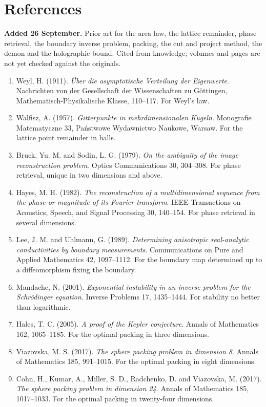 \section{References}

\textbf{Added 26 September.} Prior art for the area law, the lattice remainder, phase retrieval, the boundary inverse problem, packing, the cut and project method, the demon and the holographic bound. Cited from knowledge; volumes and pages are not yet checked against the originals.

\begin{enumerate}
  \item Weyl, H. (1911). \emph{\"Uber die asymptotische Verteilung der Eigenwerte}. Nachrichten von der Gesellschaft der Wissenschaften zu G\"ottingen, Mathematisch-Physikalische Klasse, 110--117. For Weyl's law.
  \item Walfisz, A. (1957). \emph{Gitterpunkte in mehrdimensionalen Kugeln}. Monografie Matematyczne 33, Pa\'nstwowe Wydawnictwo Naukowe, Warsaw. For the lattice point remainder in balls.
  \item Bruck, Yu. M. and Sodin, L. G. (1979). \emph{On the ambiguity of the image reconstruction problem}. Optics Communications 30, 304--308. For phase retrieval, unique in two dimensions and above.
  \item Hayes, M. H. (1982). \emph{The reconstruction of a multidimensional sequence from the phase or magnitude of its Fourier transform}. IEEE Transactions on Acoustics, Speech, and Signal Processing 30, 140--154. For phase retrieval in several dimensions.
  \item Lee, J. M. and Uhlmann, G. (1989). \emph{Determining anisotropic real-analytic conductivities by boundary measurements}. Communications on Pure and Applied Mathematics 42, 1097--1112. For the boundary map determined up to a diffeomorphism fixing the boundary.
  \item Mandache, N. (2001). \emph{Exponential instability in an inverse problem for the Schr\"odinger equation}. Inverse Problems 17, 1435--1444. For stability no better than logarithmic.
  \item Hales, T. C. (2005). \emph{A proof of the Kepler conjecture}. Annals of Mathematics 162, 1065--1185. For the optimal packing in three dimensions.
  \item Viazovska, M. S. (2017). \emph{The sphere packing problem in dimension 8}. Annals of Mathematics 185, 991--1015. For the optimal packing in eight dimensions.
  \item Cohn, H., Kumar, A., Miller, S. D., Radchenko, D. and Viazovska, M. (2017). \emph{The sphere packing problem in dimension 24}. Annals of Mathematics 185, 1017--1033. For the optimal packing in twenty-four dimensions.

\end{enumerate}
